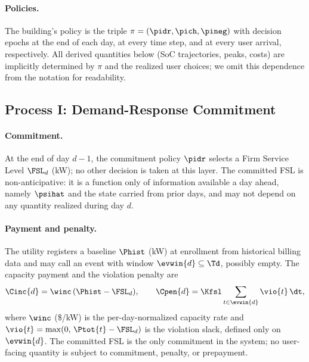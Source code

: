 \paragraph{Policies.} The building's policy is the triple $\pi =
(\pidr, \pich, \pineg)$ with decision epochs at the end of each day, at
every time step, and at every user arrival, respectively. All derived
quantities below (SoC trajectories, peaks, costs) are implicitly
determined by $\pi$ and the realized user choices; we omit this
dependence from the notation for readability.

\subsection{Process I: Demand-Response Commitment}\label{sec:dr}

\paragraph{Commitment.} At the end of day $d{-}1$, the commitment policy
$\pidr$ selects a Firm Service Level $\FSL_d$ (kW); no other decision is
taken at this layer. The committed FSL is non-anticipative: it is a function
only of information available a day ahead, namely $\psihat$ and the
state carried from prior days, and may not depend on any quantity
realized during day $d$.

\paragraph{Payment and penalty.} The utility registers a baseline
$\Phist$ (kW) at enrollment from historical billing data and may call an
event with window $\evwin{d} \subseteq \Td$, possibly empty. The
capacity payment and the violation penalty are
\begin{equation}\label{eq:dr}
\Cinc{d} = \winc\,(\Phist - \FSL_d), \qquad
\Cpen{d} = \Kfsl \sum_{t \in \evwin{d}} \vio{t}\,\dt,
\end{equation}
where $\winc$ (\$/kW) is the per-day-normalized capacity rate and
$\vio{t} = \max(0,\, \Ptot{t} - \FSL_d)$ is the violation slack, defined
only on $\evwin{d}$. The committed FSL is the only commitment in the system; no
user-facing quantity is subject to commitment, penalty, or prepayment.

